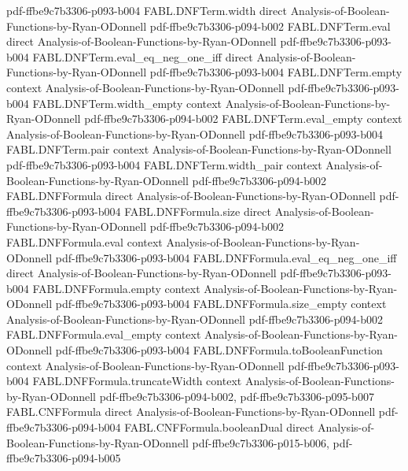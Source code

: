 \begin{theorem}
  {pdf-ffbe9c7b3306-p093-b004}
\proofstep
  {FABL.DNFTerm.width}
  {direct}
  {Analysis-of-Boolean-Functions-by-Ryan-ODonnell}
  {pdf-ffbe9c7b3306-p094-b002}
\proofstep
  {FABL.DNFTerm.eval}
  {direct}
  {Analysis-of-Boolean-Functions-by-Ryan-ODonnell}
  {pdf-ffbe9c7b3306-p093-b004}
\proofstep
  {FABL.DNFTerm.eval_eq_neg_one_iff}
  {direct}
  {Analysis-of-Boolean-Functions-by-Ryan-ODonnell}
  {pdf-ffbe9c7b3306-p093-b004}
\proofstep
  {FABL.DNFTerm.empty}
  {context}
  {Analysis-of-Boolean-Functions-by-Ryan-ODonnell}
  {pdf-ffbe9c7b3306-p093-b004}
\proofstep
  {FABL.DNFTerm.width_empty}
  {context}
  {Analysis-of-Boolean-Functions-by-Ryan-ODonnell}
  {pdf-ffbe9c7b3306-p094-b002}
\proofstep
  {FABL.DNFTerm.eval_empty}
  {context}
  {Analysis-of-Boolean-Functions-by-Ryan-ODonnell}
  {pdf-ffbe9c7b3306-p093-b004}
\proofstep
  {FABL.DNFTerm.pair}
  {context}
  {Analysis-of-Boolean-Functions-by-Ryan-ODonnell}
  {pdf-ffbe9c7b3306-p093-b004}
\proofstep
  {FABL.DNFTerm.width_pair}
  {context}
  {Analysis-of-Boolean-Functions-by-Ryan-ODonnell}
  {pdf-ffbe9c7b3306-p094-b002}
\proofstep
  {FABL.DNFFormula}
  {direct}
  {Analysis-of-Boolean-Functions-by-Ryan-ODonnell}
  {pdf-ffbe9c7b3306-p093-b004}
\proofstep
  {FABL.DNFFormula.size}
  {direct}
  {Analysis-of-Boolean-Functions-by-Ryan-ODonnell}
  {pdf-ffbe9c7b3306-p094-b002}
\proofstep
  {FABL.DNFFormula.eval}
  {context}
  {Analysis-of-Boolean-Functions-by-Ryan-ODonnell}
  {pdf-ffbe9c7b3306-p093-b004}
\proofstep
  {FABL.DNFFormula.eval_eq_neg_one_iff}
  {direct}
  {Analysis-of-Boolean-Functions-by-Ryan-ODonnell}
  {pdf-ffbe9c7b3306-p093-b004}
\proofstep
  {FABL.DNFFormula.empty}
  {context}
  {Analysis-of-Boolean-Functions-by-Ryan-ODonnell}
  {pdf-ffbe9c7b3306-p093-b004}
\proofstep
  {FABL.DNFFormula.size_empty}
  {context}
  {Analysis-of-Boolean-Functions-by-Ryan-ODonnell}
  {pdf-ffbe9c7b3306-p094-b002}
\proofstep
  {FABL.DNFFormula.eval_empty}
  {context}
  {Analysis-of-Boolean-Functions-by-Ryan-ODonnell}
  {pdf-ffbe9c7b3306-p093-b004}
\proofstep
  {FABL.DNFFormula.toBooleanFunction}
  {context}
  {Analysis-of-Boolean-Functions-by-Ryan-ODonnell}
  {pdf-ffbe9c7b3306-p093-b004}
\proofstep
  {FABL.DNFFormula.truncateWidth}
  {context}
  {Analysis-of-Boolean-Functions-by-Ryan-ODonnell}
  {pdf-ffbe9c7b3306-p094-b002,
    pdf-ffbe9c7b3306-p095-b007}
\proofstep
  {FABL.CNFFormula}
  {direct}
  {Analysis-of-Boolean-Functions-by-Ryan-ODonnell}
  {pdf-ffbe9c7b3306-p094-b004}
\proofstep
  {FABL.CNFFormula.booleanDual}
  {direct}
  {Analysis-of-Boolean-Functions-by-Ryan-ODonnell}
  {pdf-ffbe9c7b3306-p015-b006,
    pdf-ffbe9c7b3306-p094-b005}

\end{theorem}
